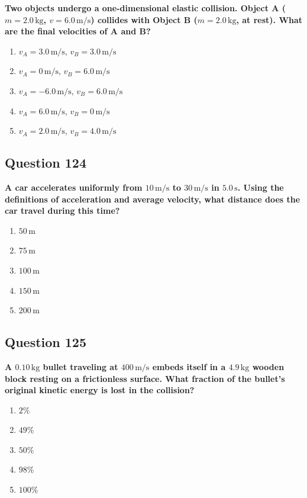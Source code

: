 \documentclass[12pt,letterpaper]{article}
\begin{document}
\begin{questionbox}
\textbf{Two objects undergo a one-dimensional elastic collision. Object A ($m = 2.0\,\text{kg}$, $v = 6.0\,\text{m/s}$) collides with Object B ($m = 2.0\,\text{kg}$, at rest). What are the final velocities of A and B?}

\begin{enumerate}[label=\alph*)]
    \item $v_A = 3.0\,\text{m/s}$, $v_B = 3.0\,\text{m/s}$
    \item $v_A = 0\,\text{m/s}$, $v_B = 6.0\,\text{m/s}$
    \item $v_A = -6.0\,\text{m/s}$, $v_B = 6.0\,\text{m/s}$
    \item $v_A = 6.0\,\text{m/s}$, $v_B = 0\,\text{m/s}$
    \item $v_A = 2.0\,\text{m/s}$, $v_B = 4.0\,\text{m/s}$
\end{enumerate}
\end{questionbox}

\subsection{Question 124}

\begin{questionbox}
\textbf{A car accelerates uniformly from $10\,\text{m/s}$ to $30\,\text{m/s}$ in $5.0\,\text{s}$. Using the definitions of acceleration and average velocity, what distance does the car travel during this time?}

\begin{enumerate}[label=\alph*)]
    \item $50\,\text{m}$
    \item $75\,\text{m}$
    \item $100\,\text{m}$
    \item $150\,\text{m}$
    \item $200\,\text{m}$
\end{enumerate}
\end{questionbox}

\subsection{Question 125}

\begin{questionbox}
\textbf{A $0.10\,\text{kg}$ bullet traveling at $400\,\text{m/s}$ embeds itself in a $4.9\,\text{kg}$ wooden block resting on a frictionless surface. What fraction of the bullet's original kinetic energy is lost in the collision?}

\begin{enumerate}[label=\alph*)]
    \item $2\%$
    \item $49\%$
    \item $50\%$
    \item $98\%$
    \item $100\%$
\end{enumerate}
\end{questionbox}
\end{document}
